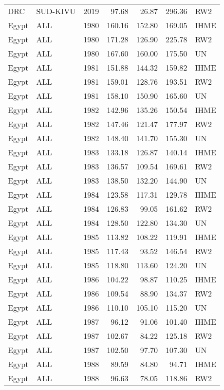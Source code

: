 \begin{longtable}{lllrrrl}
  DRC & SUD-KIVU & 2019 & 97.68 & 26.87 & 296.36 & RW2 \\ 
  Egypt & ALL & 1980 & 160.16 & 152.80 & 169.05 & IHME \\ 
  Egypt & ALL & 1980 & 171.28 & 126.90 & 225.78 & RW2 \\ 
  Egypt & ALL & 1980 & 167.60 & 160.00 & 175.50 & UN \\ 
  Egypt & ALL & 1981 & 151.88 & 144.32 & 159.82 & IHME \\ 
  Egypt & ALL & 1981 & 159.01 & 128.76 & 193.51 & RW2 \\ 
  Egypt & ALL & 1981 & 158.10 & 150.90 & 165.60 & UN \\ 
  Egypt & ALL & 1982 & 142.96 & 135.26 & 150.54 & IHME \\ 
  Egypt & ALL & 1982 & 147.46 & 121.47 & 177.97 & RW2 \\ 
  Egypt & ALL & 1982 & 148.40 & 141.70 & 155.30 & UN \\ 
  Egypt & ALL & 1983 & 133.18 & 126.87 & 140.14 & IHME \\ 
  Egypt & ALL & 1983 & 136.57 & 109.54 & 169.61 & RW2 \\ 
  Egypt & ALL & 1983 & 138.50 & 132.20 & 144.90 & UN \\ 
  Egypt & ALL & 1984 & 123.58 & 117.31 & 129.78 & IHME \\ 
  Egypt & ALL & 1984 & 126.83 & 99.05 & 161.62 & RW2 \\ 
  Egypt & ALL & 1984 & 128.50 & 122.80 & 134.30 & UN \\ 
  Egypt & ALL & 1985 & 113.82 & 108.22 & 119.91 & IHME \\ 
  Egypt & ALL & 1985 & 117.43 & 93.52 & 146.54 & RW2 \\ 
  Egypt & ALL & 1985 & 118.80 & 113.60 & 124.20 & UN \\ 
  Egypt & ALL & 1986 & 104.22 & 98.87 & 110.25 & IHME \\ 
  Egypt & ALL & 1986 & 109.54 & 88.90 & 134.37 & RW2 \\ 
  Egypt & ALL & 1986 & 110.10 & 105.10 & 115.20 & UN \\ 
  Egypt & ALL & 1987 & 96.12 & 91.06 & 101.40 & IHME \\ 
  Egypt & ALL & 1987 & 102.67 & 84.22 & 125.18 & RW2 \\ 
  Egypt & ALL & 1987 & 102.50 & 97.70 & 107.30 & UN \\ 
  Egypt & ALL & 1988 & 89.59 & 84.80 & 94.71 & IHME \\ 
  Egypt & ALL & 1988 & 96.63 & 78.05 & 118.86 & RW2 \\ 

\end{longtable}
